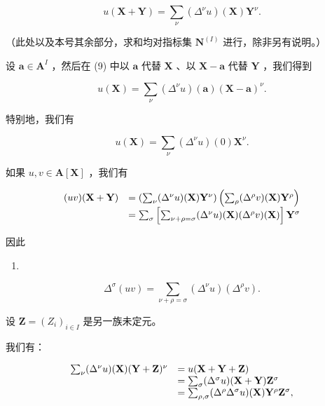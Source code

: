 \[
u (\mathbf {X} + \mathbf {Y}) = \sum_ {\nu} \left(\Delta^ {\nu} u\right) (\mathbf {X}) \mathbf {Y} ^ {\nu}.\tag{9}
\]

（此处以及本号其余部分，求和均对指标集 \(\mathbf{N}^{(I)}\) 进行，除非另有说明。）

设 \(\mathbf{a} \in \mathbf{A}^{I}\) ，然后在 (9) 中以 \(\mathbf{a}\) 代替 \(\mathbf{X}\) 、以 \(\mathbf{X} - \mathbf{a}\) 代替 \(\mathbf{Y}\) ，我们得到

\[
u (\mathbf {X}) = \sum_ {\nu} \left(\Delta^ {\nu} u\right) (\mathbf {a}) (\mathbf {X} - \mathbf {a}) ^ {\nu}.\tag{10}
\]

特别地，我们有

\[
u (\mathbf {X}) = \sum_ {\nu} \left(\Delta^ {\nu} u\right) (0) \mathbf {X} ^ {\nu}.\tag{11}
\]

如果 \(u, v \in \mathbf{A}[\mathbf{X}]\) ，我们有

\[
\begin{array}{r l} (u v) (\mathbf {X} + \mathbf {Y}) & = \left(\sum_ {\nu} (\Delta^ {\nu} u) (\mathbf {X}) \mathbf {Y} ^ {\nu}\right) \left(\sum_ {\rho} (\Delta^ {\rho} v) (\mathbf {X}) \mathbf {Y} ^ {\rho}\right) \\ & = \sum_ {\sigma} \left[ \sum_ {\nu + \rho = \sigma} (\Delta^ {\nu} u) (\mathbf {X}) (\Delta^ {\rho} v) (\mathbf {X}) \right] \mathbf {Y} ^ {\sigma} \end{array}
\]

因此

\begin{enumerate}
\def\labelenumi{(\arabic{enumi})}
\setcounter{enumi}{11}
\tightlist
\item
\end{enumerate}

\[
\Delta^ {\sigma} (u v) = \sum_ {\nu + \rho = \sigma} (\Delta^ {\nu} u) (\Delta^ {\rho} v).
\]

设 \(\mathbf{Z} = (Z_i)_{i\in I}\) 是另一族未定元。

我们有：

\[
\begin{array}{r l} \sum_ {\nu} (\Delta^ {\nu} u) (\mathbf {X}) (\mathbf {Y} + \mathbf {Z}) ^ {\nu} & = u (\mathbf {X} + \mathbf {Y} + \mathbf {Z}) \\ & = \sum_ {\sigma} (\Delta^ {\sigma} u) (\mathbf {X} + \mathbf {Y}) \mathbf {Z} ^ {\sigma} \\ & = \sum_ {\rho , \sigma} (\Delta^ {\rho} \Delta^ {\sigma} u) (\mathbf {X}) \mathbf {Y} ^ {\rho} \mathbf {Z} ^ {\sigma}, \end{array}
\]

